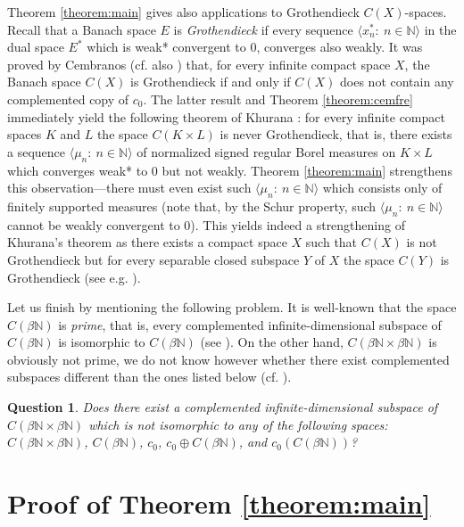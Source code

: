 \documentclass[11pt]{amsart}
\newtheorem{question}[theorem]{Question}
\theoremstyle{definition}
\theoremstyle{remark}
\numberwithin{equation}{section}
\newcommand{\N}{\mathbb{N}}
\newcommand{\seqn}[1]{\big\langle#1\colon\ n\io\big\rangle}
\newcommand{\io}{\in\mathbb{N}}%
\newcommand{\gr}{Grothendieck\ }
\begin{document}
Theorem \ref{theorem:main} gives also applications to Grothendieck $C(X)$-spaces. Recall that a Banach space $E$ is \textit{Grothendieck} if every sequence $\seqn{x_n^*}$ in the dual space $E^*$ which is weak* convergent to $0$, converges also weakly. It was proved by Cembranos \cite[Corollary 2]{Cem84} (cf. also \cite[Proposition 5.3]{Sch82}) that, for every infinite compact space $X$, the Banach space $C(X)$ is Grothendieck if and only if $C(X)$ does not contain any complemented copy of $c_0$. The latter result and Theorem \ref{theorem:cemfre} immediately yield the following theorem of Khurana \cite[Theorem 2]{Khu78}: for every infinite compact spaces $K$ and $L$ the space $C(K\times L)$ is never Grothendieck, that is, there exists a sequence $\seqn{\mu_n}$ of normalized signed regular Borel measures on $K\times L$ which converges weak* to $0$ but not weakly. Theorem \ref{theorem:main} strengthens this observation---there must even exist such $\seqn{\mu_n}$ which consists only of finitely supported measures (note that, by the Schur property, such $\seqn{\mu_n}$ cannot be weakly convergent to $0$). This yields indeed a strengthening of Khurana's theorem as there exists a compact space $X$ such that $C(X)$ is not Grothendieck but for every separable closed subspace $Y$ of $X$ the space $C(Y)$ is Grothendieck (see e.g. \cite[Example 10]{KM20}).

Let us finish by mentioning the following problem. %
It is well-known that the space $C(\beta\N)$ is \textit{prime}, that is, every complemented infinite-dimensional subspace of $C(\beta\N)$ is isomorphic to $C(\beta\N)$ (see \cite{Lin67}). On the other hand, $C(\beta\N\times\beta\N)$ is obviously not prime, we do not know however whether there exist complemented subspaces different than the ones listed below (cf. \cite{Can21}).

\begin{question}
Does there exist a complemented infinite-dimensional subspace of $C(\beta\N\times\beta\N)$ which is not isomorphic to any of the following spaces: $C(\beta\N\times\beta\N)$, $C(\beta\N)$, $c_0$, $c_0\oplus C(\beta\N)$, and $c_0(C(\beta\N))$?
\end{question}

\section{Proof of Theorem \ref{theorem:main}}

\end{document}
